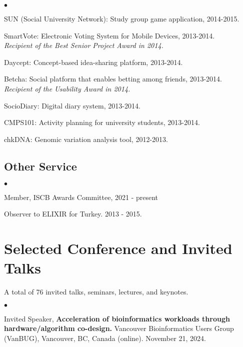 \documentclass[margin,line]{res}
\newenvironment{list2}{
  \begin{list}{$\bullet$}{%
      \setlength{\itemsep}{0.1cm}
      \setlength{\parsep}{0in} \setlength{\parskip}{0in}
      \setlength{\topsep}{0in} \setlength{\partopsep}{0in} 
      \setlength{\leftmargin}{0.2in}}}{\end{list}}
\newcommand{\junk}[1]{}
\begin{document}
\begin{resume}
\begin{list2}
  \item SUN (Social University Network): Study group game application, 2014-2015.
  \item SmartVote: Electronic Voting System for Mobile Devices, 2013-2014. \\
    {\it Recipient of the Best Senior Project Award in 2014.}
  \item Daycept: Concept-based idea-sharing platform, 2013-2014.
  \item Betcha: Social platform that enables betting among friends, 2013-2014.\\
    {\it Recipient of the Usability Award in 2014.}
  \item SocioDiary: Digital diary system, 2013-2014.
  \item CMPS101: Activity planning for university students, 2013-2014.
  \item chkDNA: Genomic variation analysis tool, 2012-2013.
\end{list2}


\vspace{-0.4cm}
\subsection{\small \sc Other Service}
\begin{list2}
    \item 
        Member, ISCB Awards Committee, 2021 - present
    \item
        Observer to ELIXIR for Turkey. 2013 - 2015.
\end{list2}

\vspace*{-.2cm}
\section{\sc Selected Conference and Invited Talks}
{\small
A total of 76 invited talks, seminars, lectures, and keynotes.
}\\

\begin{list2}

\junk{
\item
  Invited Speaker, 
      {\bf  Acceleration of read mapping through hardware/algorithm co-design.}
  Computational Genomics Summer Institute, University of California, Los Angeles, CA, United States,
  July 14, 2025..
}


\item
  Invited Speaker, 
      {\bf  Acceleration of bioinformatics workloads through hardware/algorithm co-design.}
  Vancouver Bioinformatics Users Group (VanBUG), Vancouver, BC, Canada (online).
  November 21, 2024.



\end{list2}
\end{resume}
\end{document}
